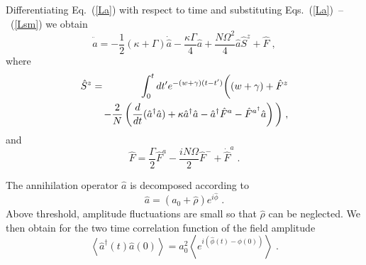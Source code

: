 \documentclass[aps,
twocolumn,
showpacs,
superscriptaddress,groupedaddress]{revtex4}
\begin{document}
Differentiating Eq.~(\ref{La}) with respect to time and substituting 
Eqs.~(\ref{La})~--~(\ref{Lsm}) we obtain
\begin{equation}
\ddot{\hat{a}} =
-\frac{1}{2} (\kappa+\Gamma)  \dot{\hat{a}} -
\frac{\kappa \Gamma}{4}\hat{a}  +
\frac{N \Omega^2 }{4} \hat{a} \hat{S}^z +\hat{F}\;,
\label{addeq}
\end{equation}
where
\begin{eqnarray}
\hat{S}^z &=&
\int_0^t dt^{\prime} e^{-(w+\gamma)(t-t^{\prime})}
\bigg( (w+\gamma) + \hat{F}^z
\nonumber
\\
&&\hspace{-3mm}-\frac{2}{N} \left( \frac{d}{dt} (\hat{a}^{\dagger} \hat{a}) +
\kappa \hat{a}^{\dagger} \hat{a} -\hat{a}^{\dagger} \hat{F}^a -
\hat{F}^{a^{\dagger}} \hat{a} \right) \bigg)\;,
\end{eqnarray}
and
\begin{equation}
\hat{F} = \frac{\Gamma}{2} \hat{F}^a-
\frac{i N \Omega}{2} \hat{F}^-+\dot{\hat{F}}^a\;.
\end{equation}

The annihilation operator $\hat{a}$ is decomposed according to
\begin{equation}
\hat{a}= (a_0 + \hat{\rho}) e^{i\hat{\phi}}\;.
\label{adecomp}
\end{equation}
Above threshold, amplitude fluctuations are small so that $\hat\rho$
can be neglected.  We then obtain for the two time correlation function
of the field amplitude
\begin{equation}
\left< \hat{a}^{\dagger}(t) \hat{a}(0) \right> =
a_0^2 \left< e^{i(\hat{\phi}(t) - \hat{\phi}(0))} \right>\;.
\end{equation}
\end{document}
